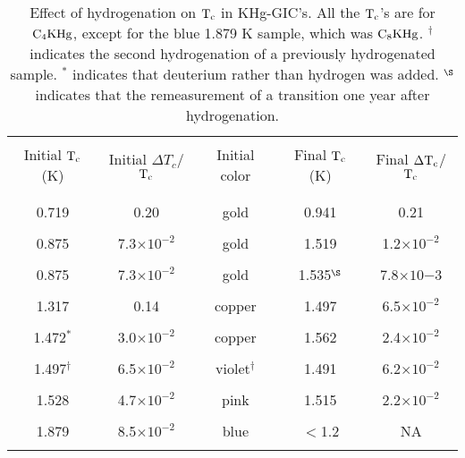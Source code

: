 \begin{table}
\begin{center}
\caption[Effect of hydrogenation on $\rm T_c$ in KHg-GIC's]{Effect of
hydrogenation on $\rm T_c$ in KHg-GIC's.  All the  $\rm T_c$'s are for $\rm
C_4KHg$,  except  for  the blue  1.879  K sample,  which was $\rm  C_8KHg$.
$^{\dagger}$    indicates the   second   hydrogenation   of a    previously
hydrogenated  sample.   $^{\ast}$   indicates that deuterium    rather than
hydrogen was added.  $^{\S}$ indicates that the remeasurement of a
transition one year after hydrogenation.}
\vspace{0.5in}
\label{hydtctable}
\begin{tabular}{|ccccc|}
\hline
& & & & \\
Initial $\rm T_c$ (K) & Initial $\Delta T_c$/$\rm T_c$ & Initial color &
Final $\rm T_c$ (K) & Final $\rm \Delta T_c$/$\rm T_c$ \\
& & & & \\
\hline
& & & & \\
0.719 & 0.20 & gold & 0.941 & 0.21\\ 	%
& & & & \\
0.875 & 7.3$\times 10^{-2}$ & gold & 1.519 & 1.2$\times 10^{-2}$\\ %
& & & & \\
0.875 & 7.3$\times 10^{-2}$ & gold & 1.535$^{\S}$	& 7.8$\times 10{-3}$\\ %
& & & & \\
1.317 & 0.14& copper & 1.497 & 6.5$\times 10^{-2}$\\	%
& & & & \\
1.472$^{\ast}$ & 3.0$\times 10^{-2}$ & copper & 1.562 & 2.4$\times 10^{-2}$\\ %
& & & & \\
1.497$^{\dagger}$ & 6.5$\times 10^{-2}$ & violet$^{\dagger}$ & 1.491 & 6.2$\times 10^{-2}$\\ %
& & & & \\
1.528 & 4.7$\times 10^{-2}$ & pink & 1.515 & 2.2$\times 10^{-2}$ \\ %
& & & & \\
1.879 & 8.5$\times 10^{-2}$ & blue & $<$1.2 & NA \\ %
& & & & \\
\hline
\end{tabular}
\end{center}
\end{table}

